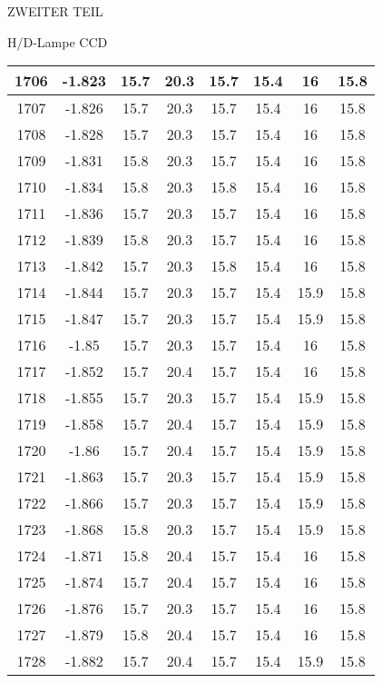 \begin{appendix}
\begin{chapter}{ZWEITER TEIL}
\begin{section}{H/D-Lampe CCD}
\begin{scriptsize}
\begin{longtable}[htbp]{|c|c|c|c|c|c|c|c|}
            1706 & -1.823 & 15.7 & 20.3 & 15.7 & 15.4 & 16 & 15.8 \\ \hline
            1707 & -1.826 & 15.7 & 20.3 & 15.7 & 15.4 & 16 & 15.8 \\ \hline
            1708 & -1.828 & 15.7 & 20.3 & 15.7 & 15.4 & 16 & 15.8 \\ \hline
            1709 & -1.831 & 15.8 & 20.3 & 15.7 & 15.4 & 16 & 15.8 \\ \hline
            1710 & -1.834 & 15.8 & 20.3 & 15.8 & 15.4 & 16 & 15.8 \\ \hline
            1711 & -1.836 & 15.7 & 20.3 & 15.7 & 15.4 & 16 & 15.8 \\ \hline
            1712 & -1.839 & 15.8 & 20.3 & 15.7 & 15.4 & 16 & 15.8 \\ \hline
            1713 & -1.842 & 15.7 & 20.3 & 15.8 & 15.4 & 16 & 15.8 \\ \hline
            1714 & -1.844 & 15.7 & 20.3 & 15.7 & 15.4 & 15.9 & 15.8 \\ \hline
            1715 & -1.847 & 15.7 & 20.3 & 15.7 & 15.4 & 15.9 & 15.8 \\ \hline
            1716 & -1.85 & 15.7 & 20.3 & 15.7 & 15.4 & 16 & 15.8 \\ \hline
            1717 & -1.852 & 15.7 & 20.4 & 15.7 & 15.4 & 16 & 15.8 \\ \hline
            1718 & -1.855 & 15.7 & 20.3 & 15.7 & 15.4 & 15.9 & 15.8 \\ \hline
            1719 & -1.858 & 15.7 & 20.4 & 15.7 & 15.4 & 15.9 & 15.8 \\ \hline
            1720 & -1.86 & 15.7 & 20.4 & 15.7 & 15.4 & 15.9 & 15.8 \\ \hline
            1721 & -1.863 & 15.7 & 20.3 & 15.7 & 15.4 & 15.9 & 15.8 \\ \hline
            1722 & -1.866 & 15.7 & 20.3 & 15.7 & 15.4 & 15.9 & 15.8 \\ \hline
            1723 & -1.868 & 15.8 & 20.3 & 15.7 & 15.4 & 15.9 & 15.8 \\ \hline
            1724 & -1.871 & 15.8 & 20.4 & 15.7 & 15.4 & 16 & 15.8 \\ \hline
            1725 & -1.874 & 15.7 & 20.4 & 15.7 & 15.4 & 16 & 15.8 \\ \hline
            1726 & -1.876 & 15.7 & 20.3 & 15.7 & 15.4 & 16 & 15.8 \\ \hline
            1727 & -1.879 & 15.8 & 20.4 & 15.7 & 15.4 & 16 & 15.8 \\ \hline
            1728 & -1.882 & 15.7 & 20.4 & 15.7 & 15.4 & 15.9 & 15.8 \\ \hline

\end{longtable}
\end{scriptsize}
\end{section}
\end{chapter}
\end{appendix}
